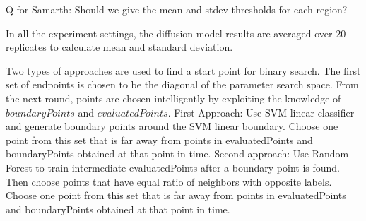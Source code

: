 {\color{magenta} Q for Samarth: Should we give the mean and stdev thresholds for each region?}

In all the experiment settings, the diffusion model results are averaged over 20 replicates to calculate mean and standard deviation. 

Two types of approaches are used to find a start point for binary search. The first set of endpoints is chosen to be the diagonal of the parameter search space. From the next round, points are chosen intelligently by exploiting the knowledge of $boundaryPoints$ and $evaluatedPoints$.
First Approach:
Use SVM linear classifier and generate boundary points around the SVM linear boundary.
Choose one point from this set that is far away from points in evaluatedPoints and boundaryPoints obtained at that point in time.
Second approach:
Use Random Forest to train intermediate evaluatedPoints after a boundary point is found. Then choose points that have equal ratio of neighbors with opposite labels. Choose one point from this set that is far away from points in evaluatedPoints and boundaryPoints obtained at that point in time.

